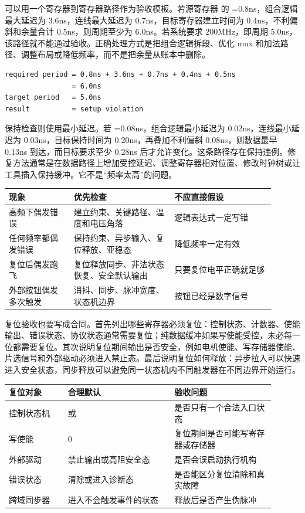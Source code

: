 可以用一个寄存器到寄存器路径作为验收模板。若源寄存器  的 =0.8ns，组合逻辑最大延迟为 3.6ns，连线最大延迟为 0.7ns，目标寄存器建立时间为 0.4ns，不利偏斜和余量合计 0.5ns，则周期至少为 6.0ns。若系统要求 200MHz，即周期 5.0ns，该路径就不能通过验收。正确处理方式是把组合逻辑拆段、优化 mux 和加法路径、调整布局或降低频率，而不是把余量从账本中删除。

\begin{lstlisting}
required period = 0.8ns + 3.6ns + 0.7ns + 0.4ns + 0.5ns
                = 6.0ns
target period   = 5.0ns
result          = setup violation
\end{lstlisting}

保持检查则使用最小延迟。若 =0.08ns，组合逻辑最小延迟为 0.02ns，连线最小延迟为 0.03ns，目标保持时间为 0.20ns，再叠加不利偏斜 0.08ns，则数据最早 0.13ns 到达，而目标要求至少 0.28ns 后才允许变化。这条路径存在保持违例。修复方法通常是在数据路径上增加受控延迟、调整寄存器相对位置、修改时钟树或让工具插入保持缓冲。它不是“频率太高”的问题。

\begin{longtable}{L{0.22\linewidth}L{0.34\linewidth}L{0.34\linewidth}}
\toprule
现象 & 优先检查 & 不应直接假设 \\
\midrule
高频下偶发错误 & 建立约束、关键路径、温度和电压角落 & 逻辑表达式一定写错 \\
任何频率都偶发错误 & 保持约束、异步输入、复位释放、亚稳态 & 降低频率一定有效 \\
复位后偶发跑飞 & 复位释放同步、非法状态恢复、安全默认输出 & 只要复位电平正确就足够 \\
外部按钮偶发多次触发 & 消抖、同步、脉冲宽度、状态机边界 & 按钮已经是数字信号 \\
\bottomrule
\end{longtable}

复位验收也要写成合同。首先列出哪些寄存器必须复位：控制状态、计数器、使能输出、错误状态、协议状态通常需要复位；纯数据缓冲如果写使能受控，未必每一位都需要复位。其次说明复位期间输出是否安全，例如电机使能、写存储器使能、片选信号和外部驱动必须进入禁止态。最后说明复位如何释放：异步拉入可以快速进入安全状态，同步释放可以避免同一状态机内不同触发器在不同边界开始运行。

\begin{longtable}{L{0.2\linewidth}L{0.36\linewidth}L{0.34\linewidth}}
\toprule
复位对象 & 合理默认 & 验收问题 \\
\midrule
控制状态机 &  或  & 是否只有一个合法入口状态 \\
写使能 & 0 & 复位期间是否可能写寄存器或存储器 \\
外部驱动 & 禁止输出或高阻安全态 & 是否会误启动执行机构 \\
错误状态 & 清除或进入诊断态 & 是否能区分复位清除和真实故障 \\
跨域同步器 & 进入不会触发事件的状态 & 释放后是否产生伪脉冲 \\
\bottomrule
\end{longtable}

